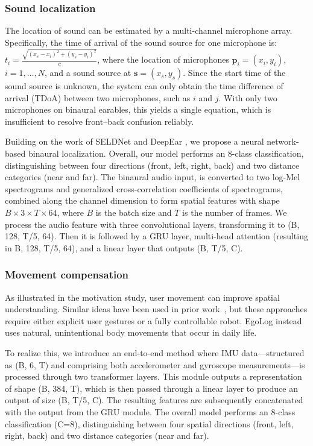 \subsubsection{Sound localization}
The location of sound can be estimated by a multi-channel microphone array. 
Specifically, the time of arrival of the sound source for one microphone is: \(t_i = \frac{\sqrt{(x_s - x_i)^2 + (y_s - y_i)^2}}{c}\), where the location of microphones $\mathbf{p}_i = (x_i, y_i)$, $i = 1, \ldots, N$, and a sound source at $\mathbf{s} = (x_s, y_s)$.
Since the start time of the sound source is unknown, the system can only obtain the time difference of arrival (TDoA) between two microphones, such as $i$ and $j$. With only two microphones on binaural earables, this yields a single equation, which is insufficient to resolve front--back confusion reliably.

Building on the work of SELDNet \citep{adavanne2018sound} and DeepEar \citep{yang2022deepear}, we propose a neural network-based binaural localization. Overall, our model performs an 8-class classification, distinguishing between four directions (front, left, right, back) and two distance categories (near and far). The binaural audio input, is converted to two log-Mel spectrograms and generalized cross-correlation coefficients of spectrograms, combined along the channel dimension to form spatial features with shape \( B \times 3 \times T \times 64 \), where \( B \) is the batch size and \( T \) is the number of frames. We process the audio feature with three convolutional layers, transforming it to (B, 128, T/5, 64). Then it is followed by a GRU layer, multi-head attention (resulting in B, 128, T/5, 64), and a linear layer that outputs (B, T/5, C).


\subsubsection{Movement compensation}

As illustrated in the motivation study, user movement can improve spatial understanding. Similar ideas have been used in prior work~\citep{zhu2021localizing, seo2022ross}, but these approaches require either explicit user gestures or a fully controllable robot. EgoLog instead uses natural, unintentional body movements that occur in daily life.

To realize this, we introduce an end-to-end method where IMU data—structured as (B, 6, T) and comprising both accelerometer and gyroscope measurements—is processed through two transformer layers. This module outputs a representation of shape (B, 384, T), which is then passed through a linear layer to produce an output of size (B, T/5, C). The resulting features are subsequently concatenated with the output from the GRU module.
The overall model performs an 8-class classification (C=8), distinguishing between four spatial directions (front, left, right, back) and two distance categories (near and far).

